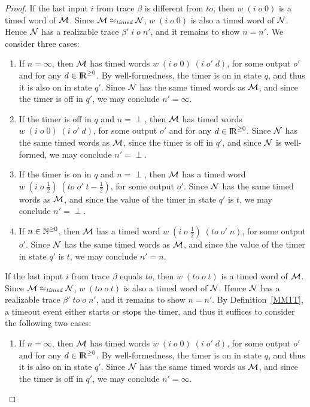 \begin{proof}
If the last input $i$ from trace $\beta$ is different from $\mathit{to}$, then
$w \; (i \; o \; 0)$ is a timed word of ${\cal M}$.
Since ${\cal M} \approx_{\mathit{timed}} {\cal N}$, $w \; (i \; o \; 0)$ is also a timed word of ${\cal N}$.
Hence ${\cal N}$ has a realizable trace $\beta' \; i \; o \; n'$, and it remains to show $n = n'$.
We consider three cases:
\begin{enumerate}
\item
If $n = \infty$, then ${\cal M}$ has timed words $w \; (i \; o \; 0) \; (i \; o' \; d)$, for some output $o'$ and for any $d \in{\rm I\!R}^{\geq 0}$.
By well-formedness, the timer is on in state $q$, and thus it is also on in state $q'$.
Since ${\cal N}$ has the same timed words as ${\cal M}$, and since the timer is off in $q'$, we may conclude $n' = \infty$.
\item
If the timer is off in $q$ and $n = \perp$, then ${\cal M}$ has timed words $w \; (i \; o \; 0) \; (i \; o' \; d)$, for some output $o'$ and for any $d \in{\rm I\!R}^{\geq 0}$.
Since ${\cal N}$ has the same timed words as ${\cal M}$, since the timer is off in $q'$, 
and since ${\cal N}$ is well-formed, we may conclude $n' = \perp$.
\item 
If the timer is on in $q$ and $n = \perp$, then ${\cal M}$ has a timed word $w \; (i \; o \; \frac{1}{2}) \; (\mathit{to} \; o' \; t- \frac{1}{2})$, for some output $o'$.
Since ${\cal N}$ has the same timed words as ${\cal M}$, and since the value of the timer in state $q'$ is $t$, we may conclude $n' = \perp$.
\item
If $n \in {\mathbb N}^{\geq 0}$, then ${\cal M}$ has a timed word $w \; (i \; o \; \frac{1}{2}) \; (\mathit{to} \; o' \; n)$, for some output $o'$.
Since ${\cal N}$ has the same timed words as ${\cal M}$, and since the value of the timer in state $q'$ is $t$, we may conclude $n' = n$.
\end{enumerate}
If the last input $i$ from trace $\beta$ equals $\mathit{to}$, then
$w \; (\mathit{to} \; o \; t)$ is a timed word of ${\cal M}$.
Since ${\cal M} \approx_{\mathit{timed}} {\cal N}$, $w \; (\mathit{to} \; o \; t)$ is also a timed word of ${\cal N}$.
Hence ${\cal N}$ has a realizable trace $\beta' \; \mathit{to} \; o \; n'$, and it remains to show $n = n'$.
By Definition~\ref{MM1T}, a timeout event either starts or stops the timer, and thus it suffices to consider the
following two cases:
\begin{enumerate}
\item
If $n = \infty$, then ${\cal M}$ has timed words $w \; (i \; o \; 0) \; (i \; o' \; d)$, for some output $o'$ and for any $d \in{\rm I\!R}^{\geq 0}$.
By well-formedness, the timer is on in state $q$, and thus it is also on in state $q'$.
Since ${\cal N}$ has the same timed words as ${\cal M}$, and since the timer is off in $q'$, we may conclude $n' = \infty$.
\end{enumerate}
\end{proof}
